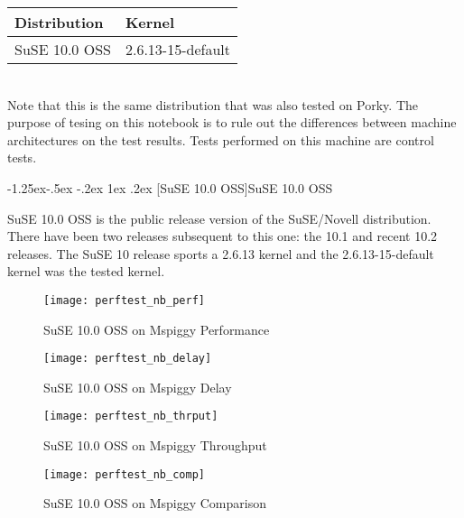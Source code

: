 \documentclass[letterpaper,final,notitlepage,twocolumn,10pt,twoside]{article}
\makeatletter
\renewcommand\subsubsection{\@startsection{subsubsection}{3}{\z@}%
                                     {-1.25ex\@plus -.5ex \@minus -.2ex}%
                                     {1ex \@plus .2ex}%
                                     {\normalfont\normalsize\bfseries}}
\makeatother
\begin{document}
\begin{tabular}{ll}\\
Distribution & Kernel\\
\hline
SuSE 10.0 OSS & 2.6.13-15-default\\
\end{tabular}\\[1.0ex]

Note that this is the same distribution that was also tested on Porky.  The
purpose of tesing on this notebook is to rule out the differences between
machine architectures on the test results.  Tests performed on this machine
are control tests.

\subsubsection[SuSE 10.0 OSS]{SuSE 10.0 OSS}

SuSE 10.0 OSS is the public release version of the SuSE/Novell distribution.
There have been two releases subsequent to this one: the 10.1 and recent 10.2
releases.  The SuSE 10 release sports a 2.6.13 kernel and the
2.6.13-15-default kernel was the tested kernel.

\begin{figure}[p]
\texttt{[image: perftest\_nb\_perf]}
\caption[SuSE 10.0 OSS on Mspiggy Performance]{SuSE 10.0 OSS on Mspiggy Performance}
\label{figure:nbperf}
\end{figure}

\begin{figure}[p]
\texttt{[image: perftest\_nb\_delay]}
\caption[SuSE 10.0 OSS on Mspiggy Delay]{SuSE 10.0 OSS on Mspiggy Delay}
\label{figure:nbdelay}
\end{figure}

\begin{figure}[p]
\texttt{[image: perftest\_nb\_thrput]}
\caption[SuSE 10.0 OSS on Mspiggy Throughput]{SuSE 10.0 OSS on Mspiggy Throughput}
\label{figure:nbthrput}
\end{figure}

\begin{figure}[p]
\texttt{[image: perftest\_nb\_comp]}
\caption[SuSE 10.0 OSS on Mspiggy Comparison]{SuSE 10.0 OSS on Mspiggy Comparison}
\label{figure:nbcomp}
\end{figure}
\end{document}
